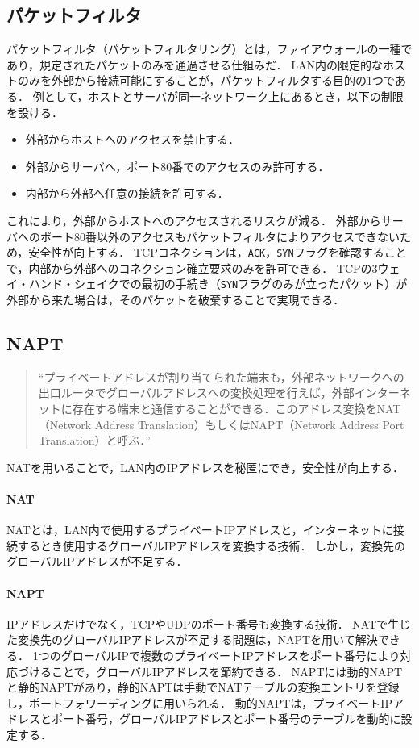 \subsection{パケットフィルタ}
パケットフィルタ（パケットフィルタリング）とは，ファイアウォールの一種であり，規定されたパケットのみを通過させる仕組みだ．
LAN内の限定的なホストのみを外部から接続可能にすることが，パケットフィルタする目的の1つである．
例として，ホストとサーバが同一ネットワーク上にあるとき，以下の制限を設ける．
\begin{itemize}
    \item 外部からホストへのアクセスを禁止する．
    \item 外部からサーバへ，ポート80番でのアクセスのみ許可する．
    \item 内部から外部へ任意の接続を許可する．
\end{itemize}
これにより，外部からホストへのアクセスされるリスクが減る．
外部からサーバへのポート80番以外のアクセスもパケットフィルタによりアクセスできないため，安全性が向上する．
TCPコネクションは，\texttt{ACK}，\texttt{SYN}フラグを確認することで，内部から外部へのコネクション確立要求のみを許可できる．
TCPの3ウェイ・ハンド・シェイクでの最初の手続き（\texttt{SYN}フラグのみが立ったパケット）が外部から来た場合は，そのパケットを破棄することで実現できる\cite[p.343]{マスタリングTCPIP}．
\subsection{NAPT}
\begin{quote}
    ``プライベートアドレスが割り当てられた端末も，外部ネットワークへの出口ルータでグローバルアドレスへの変換処理を行えば，外部インターネットに存在する端末と通信することができる．このアドレス変換をNAT（Network Address Translation）もしくはNAPT（Network Address Port Translation）と呼ぶ．''\hfill\cite[p.97]{情報通信ネットワーク}
\end{quote}
NATを用いることで，LAN内のIPアドレスを秘匿にでき，安全性が向上する．
\paragraph{NAT}
NATとは，LAN内で使用するプライベートIPアドレスと，インターネットに接続するとき使用するグローバルIPアドレスを変換する技術．
しかし，変換先のグローバルIPアドレスが不足する．
\paragraph{NAPT}
IPアドレスだけでなく，TCPやUDPのポート番号も変換する技術．
NATで生じた変換先のグローバルIPアドレスが不足する問題は，NAPTを用いて解決できる．
1つのグローバルIPで複数のプライベートIPアドレスをポート番号により対応づけることで，グローバルIPアドレスを節約できる．
NAPTには動的NAPTと静的NAPTがあり，静的NAPTは手動でNATテーブルの変換エントリを登録し，ポートフォワーディングに用いられる．
動的NAPTは，プライベートIPアドレスとポート番号，グローバルIPアドレスとポート番号のテーブルを動的に設定する．\hfill\cite{マスタリングTCPIP}
